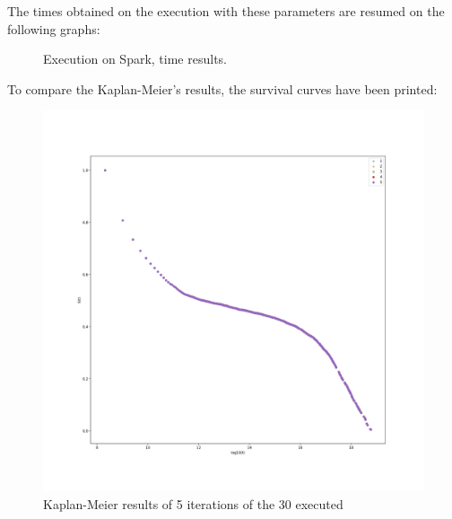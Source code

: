 \documentclass[11pt]{book} %
\begin{document}
        The times obtained on the execution with these parameters are resumed on the following graphs:

        \begin{figure}[!ht]
          \hfill
          \caption{Execution on Spark, time results.}
          \label{img:time-comparison-km-cox}
        \end{figure}

        To compare the Kaplan-Meier's results, the survival curves have been printed:

        \begin{figure}[!ht]
          \includegraphics[width=\textwidth]{km_consistency.png}
          \caption{Kaplan-Meier results of 5 iterations of the 30 executed}
          \label{img:km-consistency}
        \end{figure}
\end{document}
